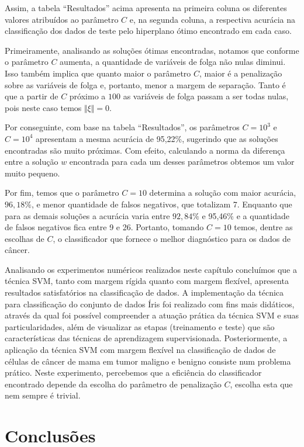 \documentclass[12pt,a4paper]{scrartcl}
\theoremstyle{definition}%
\begin{document}
Assim, a tabela ``Resultados'' acima apresenta na primeira coluna os
diferentes valores atribuídos ao parâmetro $C$ e, na segunda coluna, a
respectiva acurácia na classificação dos dados de teste pelo hiperplano
ótimo encontrado em cada caso.

Primeiramente, analisando as soluções ótimas encontradas, notamos que
conforme o parâmetro $C$ aumenta, a quantidade de variáveis de folga
não nulas diminui. Isso também implica que quanto maior o parâmetro
$C$, maior é a penalização sobre as variáveis de folga e, portanto,
menor a margem de separação. Tanto é que a partir de $C$ próximo a $100$
as variáveis de folga passam a ser todas nulas, pois neste caso temos
$\Vert \xi \Vert = 0$.

Por conseguinte, com base na tabela ``Resultados'', os parâmetros
$C = 10^{3}$ e $C = 10^{4}$ apresentam a mesma acurácia de 95,22\%,
sugerindo que as soluções encontradas são muito próximas. Com efeito,
calculando a norma da diferença entre a solução $w$ encontrada para
cada um desses parâmetros obtemos um valor muito pequeno.

Por fim, temos que o parâmetro $C = 10$ determina a solução com maior
acurácia, $96,18\%$, e menor quantidade de falsos negativos, que totalizam
7. Enquanto que para as demais soluções a acurácia varia entre $92,84\%$ e
95,46\% e a quantidade de falsos negativos fica entre 9 e 26. Portanto,
tomando $C = 10$ temos, dentre as escolhas de $C$, o classificador
que fornece o melhor diagnóstico para os dados de câncer.

Analisando os experimentos numéricos realizados neste capítulo concluímos que a técnica SVM, tanto com margem rígida quanto com margem flexível, apresenta resultados satisfatórios na classificação de dados. A implementação da técnica para classificação do conjunto de dados Íris foi realizado com fins mais didáticos, através da qual foi possível compreender a atuação prática da técnica SVM e suas particularidades, além de visualizar as etapas (treinamento e teste) que são características das técnicas de aprendizagem supervisionada. Posteriormente, a aplicação da técnica SVM com margem flexível na classificação de dados de células de câncer de mama em tumor maligno e benigno consiste num problema prático. Neste experimento, percebemos que a eficiência do classificador encontrado depende da escolha do parâmetro de penalização $C$, escolha esta que nem sempre é trivial.

\newpage
\section{Conclusões}
\end{document}
